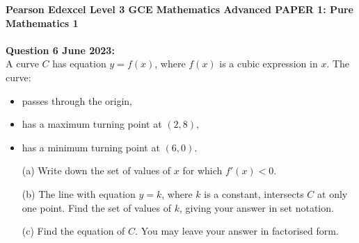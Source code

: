 \documentclass[12pt]{article}
\begin{document}
\textbf{Pearson Edexcel Level 3 GCE Mathematics
Advanced PAPER 1: Pure Mathematics 1}\\\\
\textbf{Question 6 June 2023:}\\
A curve \( C \) has equation \( y = f(x) \), where \( f(x) \) is a cubic expression in \( x \). The curve:
\begin{itemize}
    \item passes through the origin,
    \item has a maximum turning point at \( (2, 8) \),
    \item has a minimum turning point at \( (6, 0) \).
\end{itemize}
\begin{enumerate}
    \item[(a)] Write down the set of values of \( x \) for which \( f'(x) < 0 \).    
    \item[(b)] The line with equation \( y = k \), where \( k \) is a constant, intersects \( C \) at only one point. Find the set of values of \( k \), giving your answer in set notation.    
    \item[(c)] Find the equation of \( C \). You may leave your answer in factorised form.
\end{enumerate}




\pagebreak 


\pagebreak 

\nocite{*}
\printbibliography{}
\end{document}
